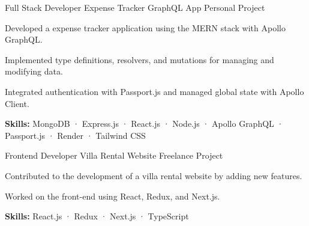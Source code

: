 

\begin{cventries}

  \cventry
    {Full Stack Developer} %
    {Expense Tracker GraphQL App} %
    {Personal Project} %
    {}
    {
      \begin{cvitems} %
        \item {Developed a expense tracker application using the MERN stack with Apollo GraphQL.}
        \item {Implemented type definitions, resolvers, and mutations for managing and modifying data.}
        \item {Integrated authentication with Passport.js and managed global state with Apollo Client.}
        \item {\textbf {Skills:} MongoDB · Express.js · React.js · Node.js · Apollo GraphQL · Passport.js · Render · Tailwind CSS}
      \end{cvitems}
    }

  \cventry
    {Frontend Developer} %
    {Villa Rental Website} %
    {Freelance Project} %
    {}
    {
      \begin{cvitems} %
        \item {Contributed to the development of a villa rental website by adding new features.}
        \item {Worked on the front-end using React, Redux, and Next.js.}
        \item {\textbf {Skills:} React.js · Redux · Next.js · TypeScript}
      \end{cvitems}
    }


\end{cventries}
